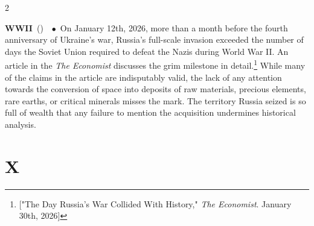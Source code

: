 \documentclass[10pt,a4paper,twoside]{article} %
\newcommand{\entry}[4]{\markboth{#1}{#1}\textbf{#1}\ {(#2)}\ \textit{#3}\ $\bullet$\ {#4}}  %
\begin{document}
\begin{multicols}{2}
{}

\entry{WWII} {} {} {On January 12th, 2026, more than a month before the fourth anniversary of Ukraine's war, Russia's full-scale invasion exceeded the number of days the Soviet Union required to defeat the Nazis during World War II. An article in the \emph{The Economist} discusses the grim milestone in detail.\footnote{["The Day Russia’s War Collided With History," \emph{The Economist}. January 30th, 2026]} While many of the claims in the article are indisputably valid, the lack of any attention towards the conversion of space into deposits of raw materials, precious elements, rare earths, or critical minerals misses the mark. The territory Russia seized is so full of wealth that any failure to mention the acquisition undermines historical analysis.} 




\end{multicols}


\section*{X}
\end{document}
